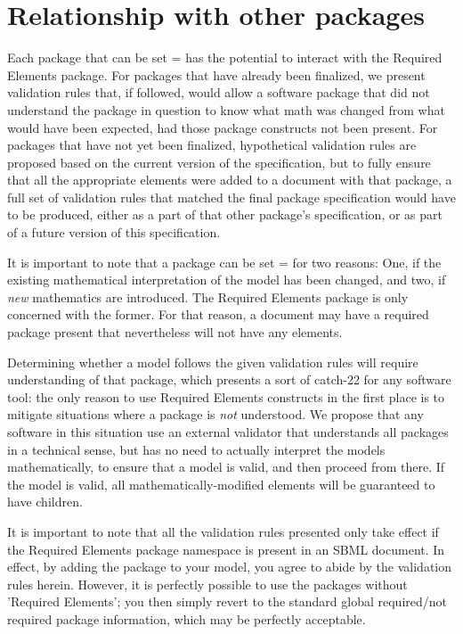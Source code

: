 
\section{Relationship with other packages}
\label{other-packages}

Each package that can be set = has the potential to interact with the Required Elements package.  For packages that have already been finalized, we present validation rules that, if followed, would allow a software package that did not understand the package in question to know what math was changed from what would have been expected, had those package constructs not been present.  For packages that have not yet been finalized, hypothetical validation rules are proposed based on the current version of the specification, but to fully ensure that all the appropriate \ChangedMath elements were added to a document with that package, a full set of validation rules that matched the final package specification would have to be produced, either as a part of that other package's specification, or as part of a future version of this specification.

It is important to note that a package can be set = for two reasons:  One, if the existing mathematical interpretation of the model has been changed, and two, if \emph{new} mathematics are introduced.  The Required Elements package is only concerned with the former.  For that reason, a document may have a required package present that nevertheless will not have any \ChangedMath elements.

Determining whether a model follows the given validation rules will require understanding of that package, which presents a sort of catch-22 for any software tool:  the only reason to use Required Elements constructs in the first place is to mitigate situations where a package is \emph{not} understood.  We propose that any software in this situation use an external validator that understands all packages in a technical sense, but has no need to actually interpret the models mathematically, to ensure that a model is valid, and then proceed from there.  If the model is valid, all mathematically-modified elements will be guaranteed to have \ChangedMath children.

It is important to note that all the validation rules presented only take effect if the Required Elements package namespace is present in an SBML document.  In effect, by adding the package to your model, you agree to abide by the validation rules herein.  However, it is perfectly possible to use the packages without 'Required Elements'; you then simply revert to the standard global required/not required package information, which may be perfectly acceptable.


